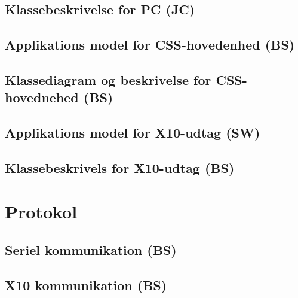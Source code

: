 \subsection{Klassebeskrivelse for PC (JC)}

\newpage

\subsection{Applikations model for CSS-hovedenhed (BS)}

\clearpage

\subsection{Klassediagram og beskrivelse for CSS-hovednehed (BS)}

\newpage

\newpage
\subsection{Applikations model for X10-udtag (SW)}

\clearpage

\subsection{Klassebeskrivels for X10-udtag (BS)}

\newpage

\section{Protokol}

\subsection{Seriel kommunikation (BS)}


\subsection{X10 kommunikation (BS)}

\newpage